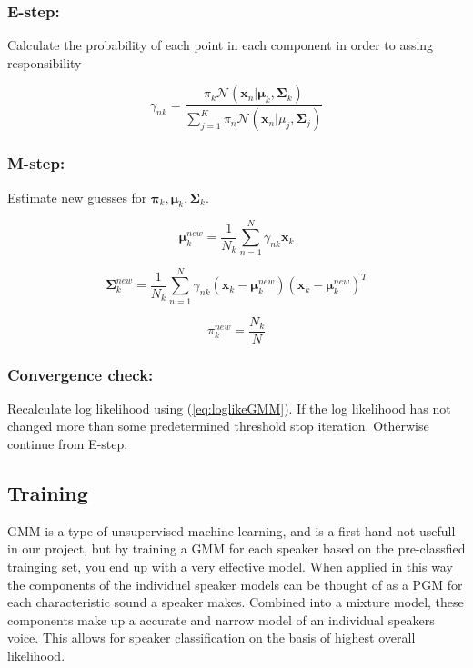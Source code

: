 \subsubsection*{E-step:}
Calculate the probability of each point in each component in order to assing responsibility

\begin{equation}
\label{eq:GMM_gamma} 
\gamma_{nk} = 
\frac
{\pi_{k}\mathcal{N}(\mathbf{x}_{n}|\mathbf{\mu}_{k},\mathbf{\Sigma}_{k})}
{\sum_{j=1}^{K} \pi_{n}\mathcal{N}(\mathbf{x}_{n}|\mu_{j},\mathbf{\Sigma}_{j})}
\end{equation}

\subsubsection*{M-step:}
Estimate new guesses for $ \mathbf{\pi}_{k}, \bm{\mu}_{k}, \bm{\Sigma}_{k} $.

\begin{equation}
\label{eq:GMM_mu} 
\bm{\mu}_{k}^{new} = 
\frac{1}{N_{k}}
\sum_{n=1}^{N} 
\gamma_{nk}
\mathbf{x}_{k}
\end{equation}

\begin{equation}
\label{eq:GMM_Sigma} 
\bm{\Sigma}_{k}^{new} = 
\frac{1}{N_{k}}
\sum_{n=1}^{N} 
\gamma_{nk}
(\mathbf{x}_{k} - \bm{\mu}_{k}^{new})
(\mathbf{x}_{k} - \bm{\mu}_{k}^{new})^{T}
\end{equation}

\begin{equation}
\pi_{k}^{new} =
\frac
{N_{k}}
{N}
\end{equation}

\subsubsection*{Convergence check:}

Recalculate log likelihood using (\ref{eq:loglikeGMM}).
If the log likelihood has not changed more than some predetermined threshold stop iteration.
Otherwise continue from E-step.

\subsection*{Training}
GMM is a type of unsupervised machine learning, and is a first hand not usefull in our project, but by training a GMM for each speaker based on the pre-classfied trainging set, you end up with a very effective model.
When applied in this way the components of the individuel speaker models can be thought of as a PGM for each characteristic sound a speaker makes.
Combined into a mixture model, these components make up a accurate and narrow model of an individual speakers voice.
This allows for speaker classification on the basis of highest overall likelihood.

